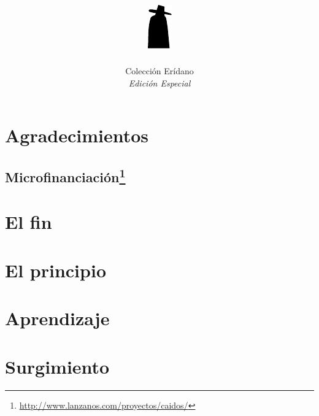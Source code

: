 \documentclass[11pt]{book}
\title{
    \vspace*{\stretch{.7}}
    \includegraphics{images/minicaido}\\
    \medskip
    \textbf{\Huge\titlename}
    \setcounter{page}{3}
}
\author{\textit{\authorname}}
\date{
    \vspace*{\stretch{1}}
    {\small Colección Erídano}\\
    \emph{\scriptsize Edición Especial}
}
\begin{document}
\pagestyle{empty}
\hbox{}\cleardoublepage
\maketitle



\chapter*{Agradecimientos}
\thispagestyle{empty}
\begin{small}
    
\end{small}

\renewcommand{\thefootnote}{\fnsymbol{footnote}}
\section*{Microfinanciación\footnote{\scriptsize\url{http://www.lanzanos.com/proyectos/caidos/}}}
\thispagestyle{empty}
\begin{small}
    
\end{small}

\newpage\hbox{}\thispagestyle{empty}\cleardoublepage


\pagestyle{fancyplain}
\chapter{El fin}


\chapter{El principio}


\chapter{Aprendizaje}


\chapter{Surgimiento}

\end{document}
